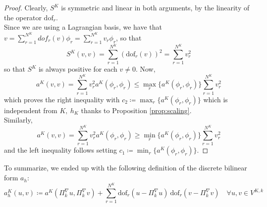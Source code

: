 \documentclass[10pt]{article}
\newcommand{\dof}{\text{dof}}
\begin{document}
\begin{proof}
	Clearly, $S^K$ is symmetric and linear in both arguments, by the linearity of the operator $\dof_r$. \\
	Since we are using a Lagrangian basis, we have that
	$v=\sum_{r=1}^{N^K} dof_r(v) \phi_r=\sum_{r=1}^{N^K} v_r \phi_r$, so that
	$$S^K(v,v)=\sum_{r=1}^{N^K} ( \dof_r(v) )^2=\sum_{r=1}^{N^K} v_r^2$$
	so that $S^K$ is always positive for each $v \neq 0$.
	Now,
	$$a^K(v,v)=\sum_{r=1}^{N^K} v_r^2 a^K(\phi_r,\phi_r) \leq \max_r \lbrace a^K(\phi_r, \phi_r) \rbrace \sum_{r=1}^{N^K} v_r^2$$
	which proves the right inequality with $c_2 \coloneqq \max_r \lbrace a^K(\phi_r, \phi_r) \rbrace$ which is independent from $K, \ h_K$ thanks to Proposition \ref{prop:scaling}. \\
	Similarly,
	$$a^K(v,v)=\sum_{r=1}^{N^K} v_r^2 a^K(\phi_r,\phi_r) \geq \min_r \lbrace a^K(\phi_r, \phi_r) \rbrace \sum_{r=1}^{N^K} v_r^2$$ 
	and the left inequality follows setting $c_1 \coloneqq \min_r \lbrace a^K(\phi_r, \phi_r) \rbrace$.
\end{proof}
To summarize, we ended up with the following definition of the discrete bilinear form $a_h$:
\begin{equation*}
a_h^K(u,v) \coloneqq a^K(\Pi_k^\nabla u, \Pi_k^\nabla v)+\sum_{r=1}^{N^K} \dof_r(u-\Pi_k^\nabla u) \ \dof_r(v-\Pi_k^\nabla v) \quad \forall u,v \in V^{K,k}
\end{equation*}
\end{document}
